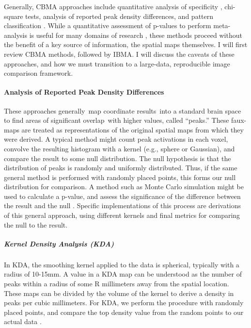 \documentclass{report}
\begin{document}
Generally, CBMA approaches include quantitative analysis of specificity \cite{Pearce1992-nr},
chi-square tests, analysis of reported peak density differences, and
pattern classification \cite{Salimi-Khorshidi2009-if,noauthor_1949-ry,Jackson1979-hc}.
While a quantitative assessment of p-values to perform meta-analysis is
useful for many domains of research \cite{Pearce1992-nr}, these
methods proceed without the benefit of a key source of information, the
spatial maps themselves. I will first review CBMA methods, followed by
IBMA. I will discuss the caveats of these approaches, and how we must
transition to a large-data, reproducible image comparison framework.

\paragraph{Analysis of Reported Peak Density Differences}

These approaches generally~map coordinate results~into a standard brain
space to find areas of significant overlap~with higher values, called
``peaks.'' These faux-maps are treated as representations of the
original spatial maps from which they were derived. A typical method
might count peak activations in each voxel, convolve the resulting
histogram with a kernel (e.g., sphere or Gaussian), and compare the
result to some null distribution. The null hypothesis is that the
distribution of peaks is randomly and uniformly distributed. Thus, if
the same general method is performed with randomly placed points, this
forms our null distribution for comparison. A method such as Monte Carlo
simulation might be used to calculate a p-value, and assess the
significance of the difference between the result and the null \cite{Salimi-Khorshidi2009-if}.
Specific implementations of this process are derivations of this general
approach, using different kernels and final metrics for comparing the
null to the result.

\subparagraph{Kernel Density Analysis (KDA)}

In KDA, the smoothing kernel applied to the data is spherical, typically
with a radius of 10-15mm. A value in a KDA map can be understood as the
number of peaks within a radius of some R millimeters away from the
spatial location. These maps can be divided by the volume of the kernel
to derive a density in peaks per cubic millimeters. For KDA, we perform
the procedure with randomly placed points, and compare the top density
value from the random points to our actual data \cite{Salimi-Khorshidi2009-if}.
\end{document}
